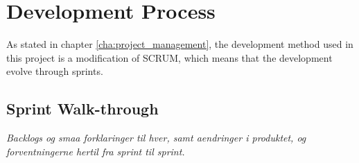 \chapter{Development Process}
As stated in chapter \ref{cha:project_management}, the development method used in this project is a modification of SCRUM, which means that the development evolve through sprints.

\section{Sprint Walk-through}
\textit{Backlogs og smaa forklaringer til hver, samt aendringer i produktet, og forventningerne hertil fra sprint til sprint.}